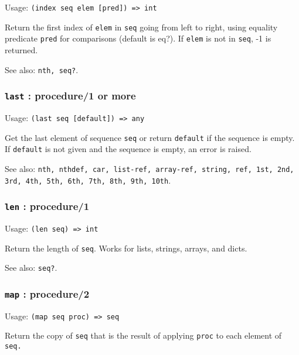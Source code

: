 \documentclass[
]{article}
\newcommand{\passthrough}[1]{#1}
\begin{document}
Usage: \passthrough{\lstinline!(index seq elem [pred]) => int!}

Return the first index of \passthrough{\lstinline!elem!} in
\passthrough{\lstinline!seq!} going from left to right, using equality
predicate \passthrough{\lstinline!pred!} for comparisons (default is
eq?). If \passthrough{\lstinline!elem!} is not in
\passthrough{\lstinline!seq!}, -1 is returned.

See also: \passthrough{\lstinline!nth, seq?!}.

\hypertarget{last-procedure1-or-more}{%
\subsubsection{\texorpdfstring{\texttt{last} : procedure/1 or
more}{last : procedure/1 or more}}\label{last-procedure1-or-more}}

Usage: \passthrough{\lstinline!(last seq [default]) => any!}

Get the last element of sequence \passthrough{\lstinline!seq!} or return
\passthrough{\lstinline!default!} if the sequence is empty. If
\passthrough{\lstinline!default!} is not given and the sequence is
empty, an error is raised.

See also:
\passthrough{\lstinline!nth, nthdef, car, list-ref, array-ref, string, ref, 1st, 2nd, 3rd, 4th, 5th, 6th, 7th, 8th, 9th, 10th!}.

\hypertarget{len-procedure1}{%
\subsubsection{\texorpdfstring{\texttt{len} :
procedure/1}{len : procedure/1}}\label{len-procedure1}}

Usage: \passthrough{\lstinline!(len seq) => int!}

Return the length of \passthrough{\lstinline!seq!}. Works for lists,
strings, arrays, and dicts.

See also: \passthrough{\lstinline!seq?!}.

\hypertarget{map-procedure2}{%
\subsubsection{\texorpdfstring{\texttt{map} :
procedure/2}{map : procedure/2}}\label{map-procedure2}}

Usage: \passthrough{\lstinline!(map seq proc) => seq!}

Return the copy of \passthrough{\lstinline!seq!} that is the result of
applying \passthrough{\lstinline!proc!} to each element of
\passthrough{\lstinline!seq.!}
\end{document}
